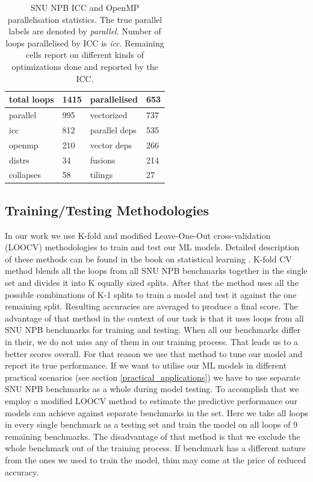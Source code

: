 \documentclass[sigconf,10pt,review,anonymous]{acmart}
\begin{document}
\begin{table}[h!]
    \centering
    \begin{tabular}[c]{|p{1.7cm}|p{1.7cm}|p{1.7cm}|p{1.7cm}|}
        \hline
        total loops & 1415 & parallelised & 653\\
        \hline
        parallel & 995 & vectorized & 737\\
        \hline
        icc & 812 & parallel deps & 535\\
        \hline
        openmp & 210 & vector deps & 266\\
        \hline
        distrs & 34 & fusions & 214\\
        \hline
        collapses & 58 & tilings & 27\\
        \hline
    \end{tabular}
    \caption{SNU NPB ICC and OpenMP parallelisation statistics. The true parallel labels are denoted by \textit{parallel}. Number of loops parallelised by ICC is \textit{icc}. Remaining cells report on different kinds of optimizations done and reported by the ICC.}
    \label{tab:icc_stats}
\end{table}

\subsection{Training/Testing Methodologies}
\label{train_test_methodologies}
\quad In our work we use K-fold and modified Leave-One-Out cross-validation (LOOCV) methodologies to train and test our ML models. Detailed description of these methods can be found in the book on statistical learning \cite{James:2014:ISL:2517747}.\newline\null
\quad K-fold CV method blends all the loops from all SNU NPB benchmarks together in the single set and divides it into K equally sized splits. After that the method uses all the possible combinations of K-1 splits to train a model and test it against the one remaining split. Resulting accuracies are averaged to produce a final score. The advantage of that method in the context of our task is that it uses loops from all SNU NPB benchmarks for training and testing. When all our benchmarks differ in their, we do not miss any of them in our training process. That leads us to a better scores overall. For that reason we use that method to tune our model and report its true performance.\newline\null
\quad If we want to utilise our ML models in different practical scenarios (see section \ref{practical_applications}) we have to use separate SNU NPB benchmarks as a whole during model testing. To accomplish that we employ a modified LOOCV method to estimate the predictive performance our models can achieve against separate benchmarks in the set. Here we take all loops in every single benchmark as a testing set and train the model on all loops of 9 remaining benchmarks. The disadvantage of that method is that we exclude the whole benchmark out of the training process. If benchmark has a different nature from the ones we used to train the model, thim may come at the price of reduced accuracy.   
\end{document}
